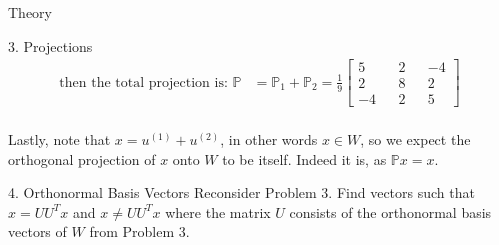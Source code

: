 \begin{section}{Theory}
\begin{homeworkSection}{3. Projections}
{\begin{align*}
        \text{then the total projection is: }
        \mathbb{P} &= \mathbb{P}_1 + \mathbb{P}_2 = \frac{1}{9} \begin{bmatrix} 5 && 2 && -4 \\ 2 && 8 && 2 \\ -4 && 2 && 5 \end{bmatrix}
    \end{align*}
    \\
    Lastly, note that $x = u^{(1)} + u^{(2)}$, in other words $x \in W$, so we expect the orthogonal projection of $x$ onto $W$ to be itself. Indeed it is, as $\mathbb{P}x = x$.
}

\end{homeworkSection}

\begin{homeworkSection}{4. Orthonormal Basis Vectors}
Reconsider Problem 3. Find vectors such that $x = UU^Tx$ and $x \neq UU^Tx$ where the matrix $U$ consists of the orthonormal basis vectors of $W$ from Problem 3.
\\
\\
\end{homeworkSection}


\end{section}
